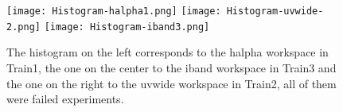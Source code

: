 \documentclass[11pt,fleqn]{book} %
\begin{document}
																																																																																																																																																																																																																																																																			\begin{figure}[h!]
																																																																																																																																																																																																																																																																				\centering
																																																																																																																																																																																																																																																																				    \texttt{[image: Histogram-halpha1.png]}
																																																																																																																																																																																																																																																																				        \texttt{[image: Histogram-uvwide-2.png]}
																																																																																																																																																																																																																																																																					    \texttt{[image: Histogram-iband3.png]}
																																																																																																																																																																																																																																																																					        \caption{The histogram on the left corresponds to the halpha workspace in Train1, the one on the center to the iband workspace in Train3 and the one on the right to the uvwide workspace in Train2, all of them were failed experiments.}
																																																																																																																																																																																																																																																																						    \label{img:fail3}
																																																																																																																																																																																																																																																																						    \end{figure}
\end{document}
